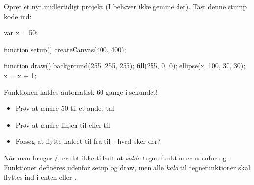 \documentclass{ucph-handout}
\begin{document}
\begin{exercisebox}[adjusted title=Simpel animation]
Opret et nyt midlertidigt projekt (I behøver ikke gemme det). Tast
denne stump kode ind:

\begin{javascript}
var x = 50;

function setup() {
    createCanvas(400, 400);
}

function draw() {
    background(255, 255, 255);
    fill(255, 0, 0);
    ellipse(x, 100, 30, 30);
    x = x + 1;
}

\end{javascript}

\noindent
Funktionen  kaldes automatisk 60 gange i sekundet!

\begin{itemize}
\item Prøv at ændre $50$ til et andet tal 
\item Prøv at ændre linjen  til  eller til 
\item Forsøg at flytte kaldet til  fra 
  til  - hvad sker der?
\end{itemize}

Når man bruger /, er det
ikke tilladt at \underline{\textit{kalde}} tegne-funktioner udenfor
 og . Funktioner defineres udenfor setup og
draw, men alle \textit{kald} til tegnefunktioner skal flyttes ind i
enten  eller .
\end{exercisebox}
\end{document}
